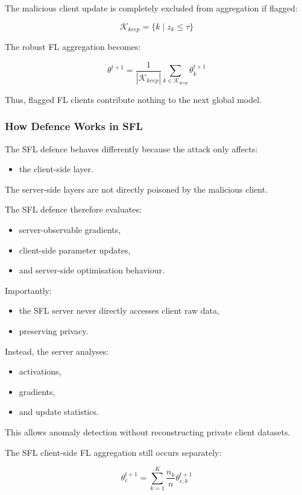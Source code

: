The malicious client update is completely excluded from aggregation if flagged:

\[
\mathcal{K}_{keep}
=
\{
k \mid z_k \leq \tau
\}
\]

The robust FL aggregation becomes:

\[
\theta^{t+1}
=
\frac{1}{|\mathcal{K}_{keep}|}
\sum_{k \in \mathcal{K}_{keep}}
\theta_k^{t+1}
\]

Thus, flagged FL clients contribute nothing to the next global model.

\subsubsection*{How Defence Works in SFL}

The SFL defence behaves differently because the attack only affects:
\begin{itemize}
    \item the client-side layer.
\end{itemize}

The server-side layers are not directly poisoned by the malicious client.

The SFL defence therefore evaluates:
\begin{itemize}
    \item server-observable gradients,
    \item client-side parameter updates,
    \item and server-side optimisation behaviour.
\end{itemize}

Importantly:
\begin{itemize}
    \item the SFL server never directly accesses client raw data,
    \item preserving privacy.
\end{itemize}

Instead, the server analyses:
\begin{itemize}
    \item activations,
    \item gradients,
    \item and update statistics.
\end{itemize}

This allows anomaly detection without reconstructing private client datasets.

The SFL client-side FL aggregation still occurs separately:

\[
\theta_c^{t+1}
=
\sum_{k=1}^{K}
\frac{n_k}{n}
\theta_{c,k}^{t+1}
\]

